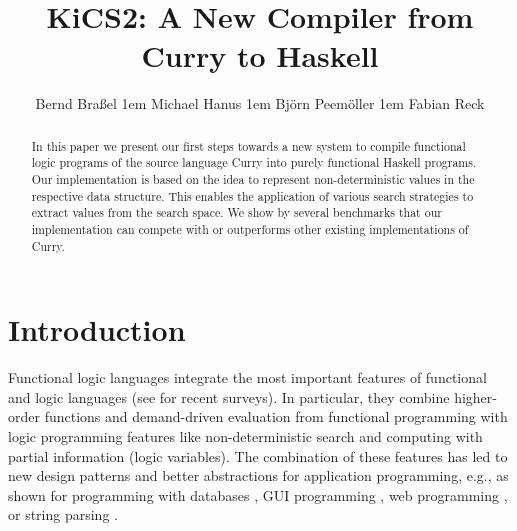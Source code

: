 \documentclass{llncs}
\begin{document}
\pagestyle{plain}
\sloppy

\title{KiCS2: A New Compiler from Curry to Haskell}

\author{
Bernd Bra{\ss}el
\kern1em
Michael Hanus
\kern1em
Bj{\"o}rn Peem{\"o}ller
\kern1em
Fabian Reck
}

\maketitle

\begin{abstract}
In this paper we present our first steps towards a new system
to compile functional logic programs of the source language Curry
into purely functional Haskell programs.
Our implementation is based on the idea to represent
non-deterministic values in the respective data structure.
This enables the application of various search strategies
to extract values from the search space.
We show by several benchmarks that our implementation
can compete with or outperforms other existing implementations of Curry.
\end{abstract}


\section{Introduction}
\label{sec:Introduction}

Functional logic languages integrate the most important
features of functional and logic languages
(see \cite{AntoyHanus10CACM,Hanus07ICLP} for recent surveys).
In particular, they combine higher-order functions and demand-driven
evaluation from functional programming with logic programming features
like non-deterministic search and computing with partial information
(logic variables).
The combination of these features
has led to new design patterns \cite{AntoyHanus02FLOPS}
and better abstractions for application programming,
e.g., as shown for programming with databases
\cite{BrasselHanusMueller08PADL,Fischer05},
GUI programming \cite{Hanus00PADL},
web programming \cite{Hanus01PADL,Hanus06PPDP,HanusKoschnicke10PADL},
or string parsing \cite{CaballeroLopez99}.
\end{document}

